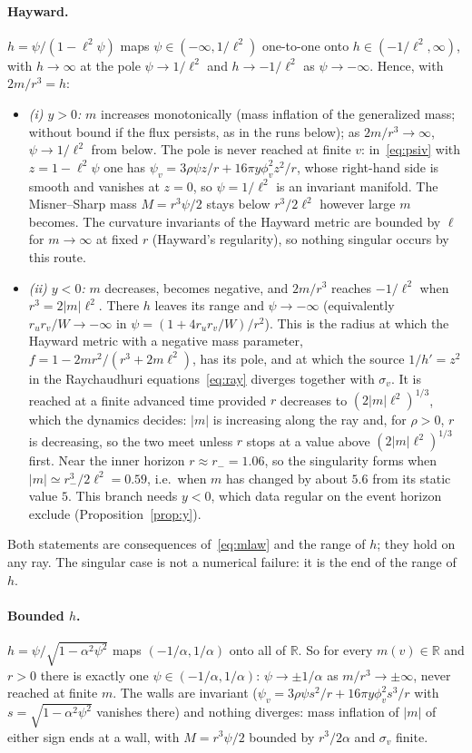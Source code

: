 \documentclass[11pt]{article}
\begin{document}
\paragraph{Hayward.} $h=\psi/(1-\ell^{2}\psi)$ maps $\psi\in(-\infty,1/\ell^{2})$ one-to-one onto $h\in(-1/\ell^{2},\infty)$, with $h\to\infty$ at the pole $\psi\to1/\ell^{2}$ and $h\to-1/\ell^{2}$ as $\psi\to-\infty$. Hence, with $2m/r^{3}=h$:
\begin{itemize}
\item \emph{(i) $y>0$:} $m$ increases monotonically (mass inflation of the generalized mass; without bound if the flux persists, as in the runs below); as $2m/r^{3}\to\infty$, $\psi\to1/\ell^{2}$ from below. The pole is never reached at finite $v$: in~\eqref{eq:psiv} with $z=1-\ell^{2}\psi$ one has $\psi_v=3\rho\psi z/r+16\pi y\phi_v^{2}z^{2}/r$, whose right-hand side is smooth and vanishes at $z=0$, so $\psi=1/\ell^{2}$ is an invariant manifold. The Misner--Sharp mass $M=r^{3}\psi/2$ stays below $r^{3}/2\ell^{2}$ however large $m$ becomes. The curvature invariants of the Hayward metric are bounded by $\ell$ for $m\to\infty$ at fixed $r$ (Hayward's regularity), so nothing singular occurs by this route.
\item \emph{(ii) $y<0$:} $m$ decreases, becomes negative, and $2m/r^{3}$ reaches $-1/\ell^{2}$ when $r^{3}=2|m|\ell^{2}$. There $h$ leaves its range and $\psi\to-\infty$ (equivalently $r_ur_v/W\to-\infty$ in $\psi=(1+4r_ur_v/W)/r^{2}$). This is the radius at which the Hayward metric with a negative mass parameter, $f=1-2mr^{2}/(r^{3}+2m\ell^{2})$, has its pole, and at which the source $1/h'=z^{2}$ in the Raychaudhuri equations~\eqref{eq:ray} diverges together with $\sigma_v$. It is reached at a finite advanced time provided $r$ decreases to $(2|m|\ell^{2})^{1/3}$, which the dynamics decides: $|m|$ is increasing along the ray and, for $\rho>0$, $r$ is decreasing, so the two meet unless $r$ stops at a value above $(2|m|\ell^{2})^{1/3}$ first. Near the inner horizon $r\approx r_-=1.06$, so the singularity forms when $|m|\simeq r_-^{3}/2\ell^{2}=0.59$, i.e.\ when $m$ has changed by about $5.6$ from its static value $5$. This branch needs $y<0$, which data regular on the event horizon exclude (Proposition~\ref{prop:y}).
\end{itemize}
Both statements are consequences of~\eqref{eq:mlaw} and the range of $h$; they hold on any ray. The singular case is not a numerical failure: it is the end of the range of $h$.

\paragraph{Bounded $h$.} $h=\psi/\sqrt{1-\alpha^{2}\psi^{2}}$ maps $(-1/\alpha,1/\alpha)$ onto all of $\mathbb R$. So for every $m(v)\in\mathbb R$ and $r>0$ there is exactly one $\psi\in(-1/\alpha,1/\alpha)$: $\psi\to\pm1/\alpha$ as $m/r^{3}\to\pm\infty$, never reached at finite $m$. The walls are invariant ($\psi_v=3\rho\psi s^{2}/r+16\pi y\phi_v^{2}s^{3}/r$ with $s=\sqrt{1-\alpha^{2}\psi^{2}}$ vanishes there) and nothing diverges: mass inflation of $|m|$ of either sign ends at a wall, with $M=r^{3}\psi/2$ bounded by $r^{3}/2\alpha$ and $\sigma_v$ finite.
\end{document}
